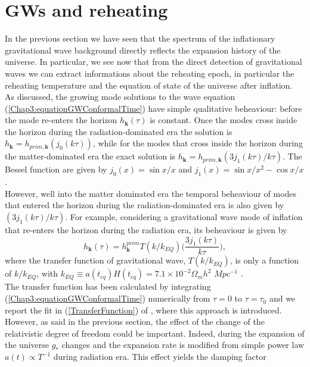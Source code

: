 \documentclass[11pt,a4paper,twoside]{book}
\begin{document}
\section{GWs and reheating}
In the previous section we have seen that the spectrum of the inflationary gravitational wave background directly reflects the expansion history of the universe. In particular, we see now that from  the direct detection of  gravitational waves we can extract informations about the reheating epoch, in particular the reheating temperature and the equation of state of the universe after inflation. \\
As discussed, the growing mode solutions to the wave equation (\ref{Chap3:equationGWConformalTime}) have simple qualitative beheaviour: before the mode re-enters the horizon $ h_{\textbf{k}}(\tau) $ is constant. Once the modes cross inside the horizon during the radiation-dominated era the solution is $ h_{\textbf{k}}=h_{prim,\textbf{k}}(j_{0}(k\tau)) $, while for the modes that cross inside the horizon during the matter-dominated era the exact solution is $  h_{\textbf{k}}=h_{prim,\textbf{k}}(3j_{1}(k\tau)/k\tau) $. The Bessel function are given by $ j_{0}(x) = \sin x/x $ and $ j_{1}(x)= \sin x/x^{2} - \cos x/x $.\\
However, well into the matter dominated era the temporal beheaviour of modes that entered the horizon during the radiation-dominated era is also given by $(3j_{1}(k\tau)/k\tau)$.  For example, considering a gravitational wave mode of inflation that re-enters the horizon during the radiation era, its beheaviour is given by
\begin{equation}
\label{Chap3:GWSimpleBeheaviour}
h_{\textbf{k}}(\tau)=h_{\textbf{k}}^{prim}T(k/k_{EQ})\Big (\frac{3j_{1}(k\tau)}{k\tau}\Big),
\end{equation} 
where the transfer function of gravitational wave, $ T(k/k_{EQ}) $, is only a function of $ k/k_{EQ} $, with $ k_{EQ} \equiv a(t_{eq})H (t_{eq}) = 7.1 \times 10^{-2}\Omega_{m}h^{2} $ $ Mpc^{-1} $ \cite{Chap3:GW_Turner_White}.\\
The transfer function has been calculated by integrating (\ref{Chap3:equationGWConformalTime}) numerically from $ \tau=0 $ to $ \tau=\tau_{0} $ and we report the fit in (\ref{TransferFunction}) of \cite{Chap3:GW_Turner_White}, where this approach is introduced. \\
However, as said in the previous section, the effect of the change of the relativistic degree of freedom could be important. Indeed, during the expansion of the universe $ g_{*} $ changes and the expansion rate is modified from simple power law $ a(t) \propto T^{-1} $ during radiation era. This effect yields the damping factor 
\end{document}
